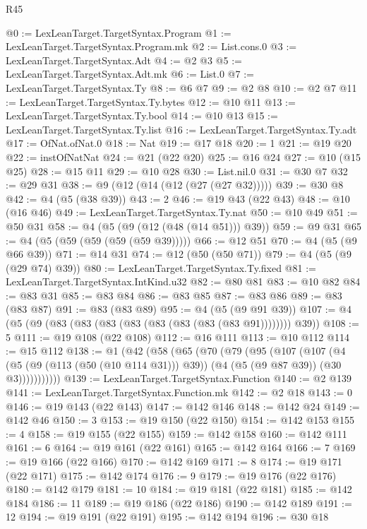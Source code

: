 \begin{lexlean}{R45}
\begin{coremodule}
@0 := LexLeanTarget.TargetSyntax.Program
@1 := LexLeanTarget.TargetSyntax.Program.mk
@2 := List.cons.{0}
@3 := LexLeanTarget.TargetSyntax.Adt
@4 := @2 @3
@5 := LexLeanTarget.TargetSyntax.Adt.mk
@6 := List.{0}
@7 := LexLeanTarget.TargetSyntax.Ty
@8 := @6 @7
@9 := @2 @8
@10 := @2 @7
@11 := LexLeanTarget.TargetSyntax.Ty.bytes
@12 := @10 @11
@13 := LexLeanTarget.TargetSyntax.Ty.bool
@14 := @10 @13
@15 := LexLeanTarget.TargetSyntax.Ty.list
@16 := LexLeanTarget.TargetSyntax.Ty.adt
@17 := OfNat.ofNat.{0}
@18 := Nat
@19 := @17 @18
@20 := 1
@21 := @19 @20
@22 := instOfNatNat
@24 := @21 (@22 @20)
@25 := @16 @24
@27 := @10 (@15 @25)
@28 := @15 @11
@29 := @10 @28
@30 := List.nil.{0}
@31 := @30 @7
@32 := @29 @31
@38 := @9 (@12 (@14 (@12 (@27 (@27 @32)))))
@39 := @30 @8
@42 := @4 (@5 (@38 @39))
@43 := 2
@46 := @19 @43 (@22 @43)
@48 := @10 (@16 @46)
@49 := LexLeanTarget.TargetSyntax.Ty.nat
@50 := @10 @49
@51 := @50 @31
@58 := @4 (@5 (@9 (@12 (@48 (@14 @51))) @39))
@59 := @9 @31
@65 := @4 (@5 (@59 (@59 (@59 (@59 @39)))))
@66 := @12 @51
@70 := @4 (@5 (@9 @66 @39))
@71 := @14 @31
@74 := @12 (@50 (@50 @71))
@79 := @4 (@5 (@9 (@29 @74) @39))
@80 := LexLeanTarget.TargetSyntax.Ty.fixed
@81 := LexLeanTarget.TargetSyntax.IntKind.u32
@82 := @80 @81
@83 := @10 @82
@84 := @83 @31
@85 := @83 @84
@86 := @83 @85
@87 := @83 @86
@89 := @83 (@83 @87)
@91 := @83 (@83 @89)
@95 := @4 (@5 (@9 @91 @39))
@107 := @4 (@5 (@9 (@83 (@83 (@83 (@83 (@83 (@83 (@83 (@83 @91)))))))) @39))
@108 := 5
@111 := @19 @108 (@22 @108)
@112 := @16 @111
@113 := @10 @112
@114 := @15 @112
@138 := @1
    (@42
      (@58
        (@65
          (@70
            (@79
              (@95
                (@107
                  (@107
                    (@4
                      (@5 (@9 (@113 (@50 (@10 @114 @31))) @39))
                      (@4 (@5 (@9 @87 @39)) (@30 @3)))))))))))
@139 := LexLeanTarget.TargetSyntax.Function
@140 := @2 @139
@141 := LexLeanTarget.TargetSyntax.Function.mk
@142 := @2 @18
@143 := 0
@146 := @19 @143 (@22 @143)
@147 := @142 @146
@148 := @142 @24
@149 := @142 @46
@150 := 3
@153 := @19 @150 (@22 @150)
@154 := @142 @153
@155 := 4
@158 := @19 @155 (@22 @155)
@159 := @142 @158
@160 := @142 @111
@161 := 6
@164 := @19 @161 (@22 @161)
@165 := @142 @164
@166 := 7
@169 := @19 @166 (@22 @166)
@170 := @142 @169
@171 := 8
@174 := @19 @171 (@22 @171)
@175 := @142 @174
@176 := 9
@179 := @19 @176 (@22 @176)
@180 := @142 @179
@181 := 10
@184 := @19 @181 (@22 @181)
@185 := @142 @184
@186 := 11
@189 := @19 @186 (@22 @186)
@190 := @142 @189
@191 := 12
@194 := @19 @191 (@22 @191)
@195 := @142 @194
@196 := @30 @18

\end{coremodule}
\end{lexlean}
